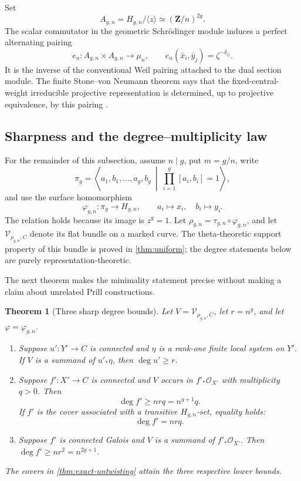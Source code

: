 \documentclass[11pt,reqno]{amsart}
\numberwithin{equation}{section}
\newtheorem{theorem}{Theorem}[section]
\theoremstyle{remark}
\newcommand{\cO}{\mathcal O}
\newcommand{\cV}{\mathcal V}
\newcommand{\bZ}{\mathbf Z}
\begin{document}
Set
\[
 A_{g,n}=H_{g,n}/\langle z\rangle\simeq(\bZ/n)^{2g}.
\tag{2.5}\label{eq:heisenberg-quotient}
\]
The scalar commutator in the geometric Schr\"odinger module induces a
perfect alternating pairing
\[
 e_n\colon A_{g,n}\times A_{g,n}\longrightarrow\mu_n,
 \qquad e_n(\bar x_i,\bar y_j)=\zeta^{-\delta_{ij}}.
\tag{2.6}\label{eq:weil-pairing}
\]
It is the inverse of the conventional Weil pairing attached to the dual
section module.  The finite Stone--von Neumann theorem says that the
fixed-central-weight irreducible projective representation is determined,
up to projective equivalence, by this pairing
\cite{MumfordTheta,Schneider}.

\subsection{Sharpness and the degree--multiplicity law}

For the remainder of this subsection, assume \(n\mid g\), put
\(m=g/n\), write
\[
 \pi_g=\left\langle a_1,b_1,\ldots,a_g,b_g\ \middle|\
 \prod_{i=1}^g[a_i,b_i]=1\right\rangle,
\]
and use the surface homomorphism
\[
 \varphi_{g,n}\colon\pi_g\longrightarrow H_{g,n},\qquad
 a_i\longmapsto x_i,\quad b_i\longmapsto y_i.
\]
The relation holds because its image is \(z^g=1\).  Let
\(\rho_{g,n}=\tau_{g,n}\circ\varphi_{g,n}\), and let
\(\cV_{\rho_{g,n},C}\) denote its flat bundle on a marked curve.  The
theta-theoretic support property of this bundle is proved in
\cref{thm:uniform}; the degree statements below are purely
representation-theoretic.

The next theorem makes the minimality statement precise without making a
claim about unrelated Prill constructions.

\begin{theorem}[Three sharp degree bounds]\label{thm:three-optima}
Let \(V=\cV_{\rho_{g,n},C}\), let \(r=n^g\), and let
\(\varphi=\varphi_{g,n}\).
\begin{enumerate}[label=\textup{(\roman*)}]
\item Suppose \(u'\colon Y'\to C\) is connected and \(\eta\) is a
rank-one finite local system on \(Y'\).  If \(V\) is a summand of
\(u'_*\eta\), then \(\deg u'\geq r\).
\item Suppose \(f'\colon X'\to C\) is connected and \(V\) occurs in
\(f'_*\cO_{X'}\) with multiplicity \(q>0\).  Then
\[
 \deg f'\geq nrq=n^{g+1}q.
\tag{2.7}\label{eq:arbitrary-cover-bound}
\]
If \(f'\) is the cover associated with a transitive \(H_{g,n}\)-set,
equality holds:
\[
 \deg f'=nrq.
\tag{2.8}\label{eq:exact-pareto}
\]
\item Suppose \(f'\) is connected Galois and \(V\) is a summand of
\(f'_*\cO_{X'}\).  Then \(\deg f'\geq nr^2=n^{2g+1}\).
\end{enumerate}
The covers in \cref{thm:exact-untwisting} attain the three respective
lower bounds.
\end{theorem}
\end{document}

